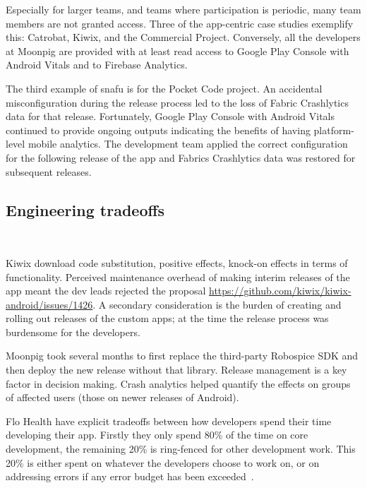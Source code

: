 Especially for larger teams, and teams where participation is periodic, many team members are not granted access. Three of the app-centric case studies exemplify this: Catrobat, Kiwix, and the Commercial Project. Conversely, all the developers at Moonpig are provided with at least read access to Google Play Console with Android Vitals and to Firebase Analytics.

The third example of snafu is for the Pocket Code project. An accidental misconfiguration during the release process led to the loss of Fabric Crashlytics data for that release. Fortunately, Google Play Console with Android Vitals continued to provide ongoing outputs indicating the benefits of having platform-level mobile analytics. The development team applied the correct configuration for the following release of the app and Fabrics Crashlytics data was restored for subsequent releases.

\subsection{Engineering tradeoffs}~\label{aiu-engineering-tradeoffs-section}

Kiwix download code substitution, positive effects, knock-on effects in terms of functionality.
Perceived maintenance overhead of making interim releases of the app meant the dev leads rejected the proposal \url{https://github.com/kiwix/kiwix-android/issues/1426}. A secondary consideration is the burden of creating and rolling out releases of the custom apps; at the time the release process was burdensome for the developers. 

Moonpig took several months to first replace the third-party Robospice SDK and then deploy the new release without that library. 
Release management is a key factor in decision making. Crash analytics helped quantify the effects on groups of affected users (those on newer releases of Android).

Flo Health have explicit tradeoffs between how developers spend their time developing their app. Firstly they only spend 80\% of the time on core development, the remaining 20\% is ring-fenced for other development work. This 20\% is either spent on whatever the developers choose to work on, or on addressing errors if any error budget has been exceeded~\citep{koutun2021_how_to_deal_with_tech_debt_at_the_scale_of_super_app}.


